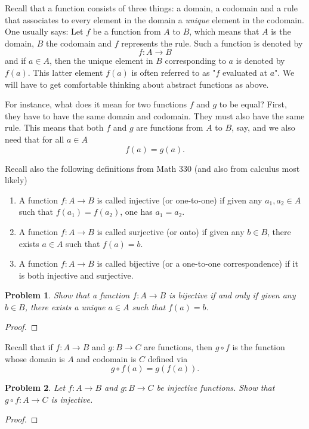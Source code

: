 \documentclass[reqno]{amsart}
\theoremstyle{plain}
\newtheorem{problem}{Problem}
\theoremstyle{definition}
\begin{document}
Recall that a function consists of three things:  a domain, a codomain and a rule that associates to every element in the domain a \emph{unique} element in the codomain.  One usually says:  Let $f$ be a function from $A$ to $B$, which means that $A$ is the domain, $B$ the codomain and $f$ represents the rule.  Such a function is denoted by
$$f:A \longrightarrow B $$
and if $a \in A$, then the unique element in $B$ corresponding to $a$ is denoted by $f(a)$.  This latter element $f(a)$ is often referred to as "$f$ evaluated at $a$".  We will have to get comfortable thinking about abstract functions as above.  

For instance, what does it mean for two functions $f$ and $g$ to be equal?  First, they have to have the same domain and codomain.  They must also have the same rule.  This means that both $f$ and $g$ are functions from $A$ to $B$, say, and we also need that for all $a \in A$
$$f(a) = g(a). $$

Recall also the following definitions from Math 330 (and also from calculus most likely)
\begin{enumerate}
\item A function $f:A \longrightarrow B$ is called injective (or one-to-one) if given any $a_{1},a_{2} \in A$ such that $f(a_{1}) = f(a_{2})$, one has $a_{1} = a_{2}$.
\item A function $f:A \longrightarrow B$ is called surjective (or onto) if given any $b \in B$, there exists $a \in A$ such that $f(a) = b$.
\item A function $f:A \longrightarrow B$ is called bijective (or a one-to-one correspondence) if it is both injective and surjective.
\end{enumerate}

\begin{problem}
Show that a function $f:A \longrightarrow B$ is bijective if and only if given any $b \in B$, there exists a \emph{unique} $a \in A$ such that $f(a) = b$.
\end{problem}

\begin{proof}

\end{proof}

Recall that if $f:A \longrightarrow B$ and $g: B \longrightarrow C$ are functions, then $g \circ f$ is the function whose domain is $A$ and codomain is $C$ defined via
$$g \circ f (a) = g(f(a)). $$

\begin{problem}
Let $f:A \longrightarrow B$ and $g:B \longrightarrow C$ be injective functions.  Show that $g \circ f: A \longrightarrow C$ is injective.
\end{problem}
\begin{proof}

\end{proof}
\end{document}
